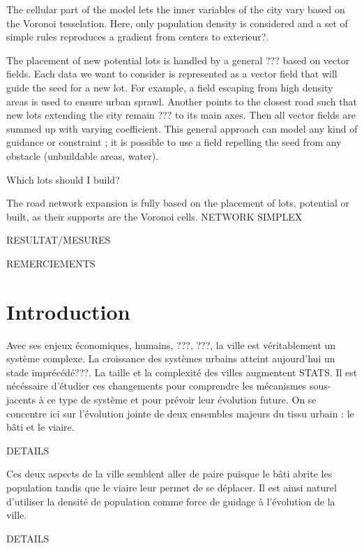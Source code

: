 \documentclass[12pt]{article}
\begin{document}
The cellular part of the model lets the inner variables of the city
vary based on the Voronoi tesselation. Here, only population density
is considered and a set of simple rules reproduces a gradient from
centers to exterieur?.

The placement of new potential lots is handled by a general ??? based
on vector fields. Each data we want to consider is represented as a
vector field that will guide the seed for a new lot. For example, a
field escaping from high density areas is used to ensure urban
sprawl. Another points to the closest road such that new lots
extending the city remain ??? to its main axes. Then all vector fields
are summed up with varying coefficient. This general approach can
model any kind of guidance or constraint ; it is possible to use a
field repelling the seed from any obstacle (unbuildable areas, water).

Which lots should I build?

The road network expansion is fully based on the placement of lots,
potential or built, as their supports are the Voronoi cells. NETWORK
SIMPLEX

RESULTAT/MESURES

\newpage

\tableofcontents

\newpage

REMERCIEMENTS

\newpage

\section{Introduction}

Avec ses enjeux économiques, humains, ???, ???, la ville est
véritablement un système complexe. La croissance des systèmes urbains
atteint aujourd'hui un stade imprécédé???. La taille et la complexité
des villes augmentent STATS. Il est nécéssaire d'étudier ces
changements pour comprendre les mécanismes sous-jacents à ce type de
système et pour prévoir leur évolution future. On se concentre ici sur
l'évolution jointe de deux ensembles majeurs du tissu urbain : le bâti
et le viaire.

DETAILS

Ces deux aspects de la ville semblent aller de paire puisque le bâti
abrite les population tandis que le viaire leur permet de se
déplacer. Il est ainsi naturel d'utiliser la densité de population
comme force de guidage à l'évolution de la ville.

DETAILS
\end{document}
